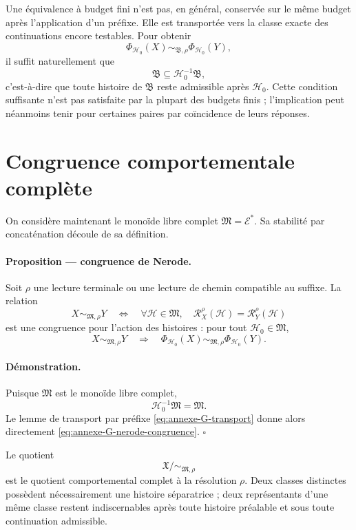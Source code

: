 Une équivalence à budget fini n'est pas, en général, conservée sur le
même budget après l'application d'un préfixe. Elle est transportée vers
la classe exacte des continuations encore testables. Pour obtenir
\[
\Phi_{\mathcal H_0}(X)
\sim_{\mathfrak B,\rho}
\Phi_{\mathcal H_0}(Y),
\]
il suffit naturellement que
\[
\mathfrak B\subseteq\mathcal H_0^{-1}\mathfrak B,
\]
c'est-à-dire que toute histoire de \(\mathfrak B\) reste admissible
après \(\mathcal H_0\). Cette condition suffisante n'est pas satisfaite
par la plupart des budgets finis ; l'implication peut néanmoins tenir
pour certaines paires par coïncidence de leurs réponses.

\section{Congruence comportementale complète}
\label{annexe-histoires-nerode}

On considère maintenant le monoïde libre complet
\(\mathfrak M=\mathcal E^\ast\). Sa stabilité par concaténation découle
de sa définition.

\paragraph{Proposition \theproposition{} --- congruence de Nerode.}
Soit \(\rho\) une lecture terminale ou une lecture de chemin compatible
au suffixe. La relation
\[
X\sim_{\mathfrak M,\rho}Y
\quad\Longleftrightarrow\quad
\forall\mathcal H\in\mathfrak M,
\quad
\mathcal R_X^\rho(\mathcal H)
=
\mathcal R_Y^\rho(\mathcal H)
\]
est une congruence pour l'action des histoires : pour tout
\(\mathcal H_0\in\mathfrak M\),
\begin{equation}
\label{eq:annexe-G-nerode-congruence}
X\sim_{\mathfrak M,\rho}Y
\quad\Longrightarrow\quad
\Phi_{\mathcal H_0}(X)
\sim_{\mathfrak M,\rho}
\Phi_{\mathcal H_0}(Y).
\end{equation}

\paragraph{Démonstration.}
Puisque \(\mathfrak M\) est le monoïde libre complet,
\[
\mathcal H_0^{-1}\mathfrak M=\mathfrak M.
\]
Le lemme de transport par préfixe
\eqref{eq:annexe-G-transport} donne alors directement
\eqref{eq:annexe-G-nerode-congruence}.
\hfill\(\square\)

Le quotient
\[
\mathfrak X/{\sim_{\mathfrak M,\rho}}
\]
est le quotient comportemental complet à la résolution \(\rho\). Deux
classes distinctes possèdent nécessairement une histoire séparatrice ;
deux représentants d'une même classe restent indiscernables après
toute histoire préalable et sous toute continuation admissible.

